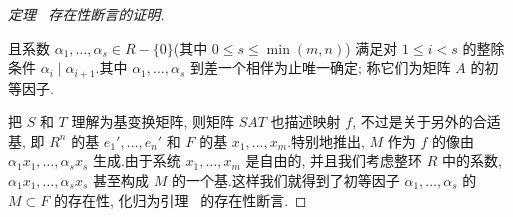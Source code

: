 \begin{proof}[定理~ 存在性断言的证明]
\begin{lemma}
且系数 $\alpha_1, \ldots, \alpha_s \in R - \{0\}$(其中 $0 \leq s \leq \min(m, n)$) 满足对 $1 \leq i < s$ 的整除条件 $\alpha_i \mid \alpha_{i + 1}$.其中 $\alpha_1, \ldots, \alpha_s$ 到差一个相伴为止唯一确定; 称它们为矩阵 $A$ 的初等因子.
\end{lemma}

把 $S$ 和 $T$ 理解为基变换矩阵, 则矩阵 $SAT$ 也描述映射 $f$, 不过是关于另外的合适基, 即 $R^n$ 的基 $e_1', \ldots, e_n'$ 和 $F$ 的基 $x_1, \ldots, x_m$.特别地推出, $M$ 作为 $f$ 的像由 $\alpha_1 x_1, \ldots, \alpha_s x_s$ 生成.由于系统 $x_1, \ldots, x_m$ 是自由的, 并且我们考虑整环 $R$ 中的系数, $\alpha_1 x_1, \ldots, \alpha_s x_s$ 甚至构成 $M$ 的一个基.这样我们就得到了初等因子 $\alpha_1, \ldots, \alpha_s$ 的 $M \subset F$ 的存在性, 化归为引理~ 的存在性断言.
\end{proof}

